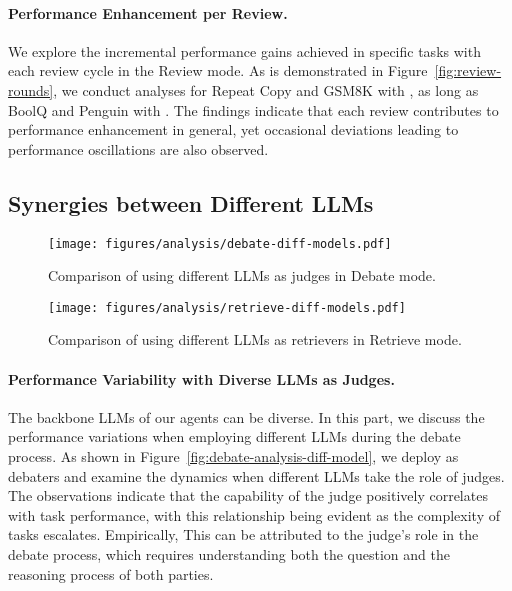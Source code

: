 \paragraph{Performance Enhancement per Review.}

We explore the incremental performance gains achieved in specific tasks with each review cycle in the Review mode.
As is demonstrated in Figure~\ref{fig:review-rounds},
we conduct analyses for Repeat Copy and GSM8K with \rcode, 
as long as BoolQ and Penguin with \rnl.
The findings indicate that each review contributes to performance enhancement in general,
yet occasional deviations leading to performance oscillations are also observed.
\subsection{Synergies between Different LLMs}

\begin{figure}[ht]
    \centering
    \begin{minipage}[t]{0.48\textwidth}
        \texttt{[image: figures/analysis/debate-diff-models.pdf]}
        \caption{Comparison of using different LLMs as judges in Debate mode.}
        \label{fig:debate-analysis-diff-model}
    \end{minipage}
    \hfill
    \begin{minipage}[t]{0.48\textwidth}
        \texttt{[image: figures/analysis/retrieve-diff-models.pdf]}
        \caption{Comparison of using different LLMs as retrievers in Retrieve mode.}
        \label{fig:retrieve-analysis-diff-model}
    \end{minipage}
\end{figure}


\paragraph{Performance Variability with Diverse LLMs as Judges.}

The backbone LLMs of our agents can be diverse.
In this part,
we discuss the performance variations when employing different LLMs during the debate process.
As shown in Figure~\ref{fig:debate-analysis-diff-model},
we deploy \turbon as debaters and examine the dynamics when different LLMs take the role of judges. 
The observations indicate that the capability of the judge positively correlates with task performance,
with this relationship being evident as the complexity of tasks escalates.
Empirically, 
This can be attributed to the judge's role in the debate process,
which requires understanding both the question and the reasoning process of both parties.


